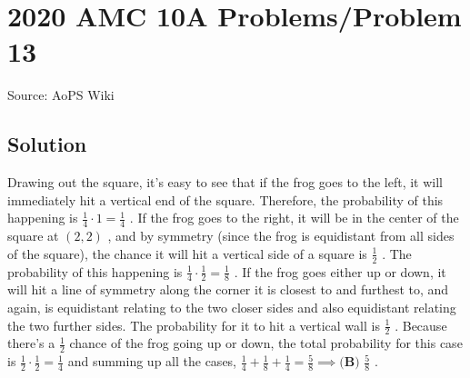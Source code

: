 \documentclass[12pt]{article}
\begin{document}
\section*{{2020 AMC 10A Problems/Problem 13}}
Source: AoPS Wiki

\subsection*{Solution}
Drawing out the square, it's easy to see that if the frog goes to the left, it will immediately hit a vertical end of the square. Therefore, the probability of this happening is $\frac{1}{4} \cdot 1 = \frac{1}{4}$ . If the frog goes to the right, it will be in the center of the square at $(2,2)$ , and by symmetry (since the frog is equidistant from all sides of the square), the chance it will hit a vertical side of a square is $\frac{1}{2}$ . The probability of this happening is $\frac{1}{4} \cdot \frac{1}{2} = \frac{1}{8}$ . If the frog goes either up or down, it will hit a line of symmetry along the corner it is closest to and furthest to, and again, is equidistant relating to the two closer sides and also equidistant relating the two further sides. The probability for it to hit a vertical wall is $\frac{1}{2}$ . Because there's a $\frac{1}{2}$ chance of the frog going up or down, the total probability for this case is $\frac{1}{2} \cdot \frac{1}{2} = \frac{1}{4}$ and summing up all the cases, $\frac{1}{4} + \frac{1}{8} + \frac{1}{4} = \frac{5}{8} \implies \boxed{\textbf{(B) } \frac{5}{8}}$ .
\end{document}
